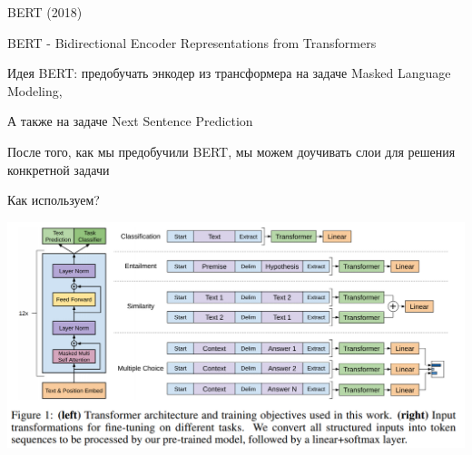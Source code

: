 \documentclass[notes,12pt, aspectratio=169]{beamer}
\newenvironment{wideitemize}{\itemize\addtolength{\itemsep}{10pt}}{\enditemize}
\begin{document}
\begin{frame}{BERT (2018)}
\begin{wideitemize}
	\item  BERT - Bidirectional Encoder Representations from Transformers
	\item  \alert{Идея BERT:} предобучать энкодер из трансформера на задаче Masked Language Modeling,
	\item А также на задаче Next Sentence Prediction
	\item После того, как мы предобучили BERT,  мы можем доучивать слои для решения конкретной задачи 
\end{wideitemize}
\end{frame}


\begin{frame}{Как используем?}
\begin{center}
	\includegraphics[width=0.9\linewidth]{images/use_models}
\end{center}
\end{frame}


\end{document}
